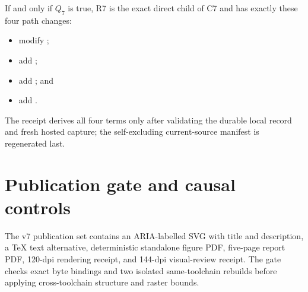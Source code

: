 \documentclass[11pt,a4paper]{article}
\begin{document}
If and only if \(Q_7\) is true, R7 is the exact direct child of C7 and has exactly these four path
changes:
\begin{itemize}
  \item modify ;
  \item add ;
  \item add ; and
  \item add .
\end{itemize}
The receipt derives all four terms only after validating the durable local record and fresh hosted
capture; the self-excluding current-source manifest is regenerated last.

\clearpage
\section{Publication gate and causal controls}

The v7 publication set contains an ARIA-labelled SVG with title and description, a TeX text
alternative, deterministic standalone figure PDF, five-page report PDF, 120-dpi rendering receipt,
and 144-dpi visual-review receipt. The gate checks exact byte bindings and two isolated
same-toolchain rebuilds before applying cross-toolchain structure and raster bounds.
\end{document}
